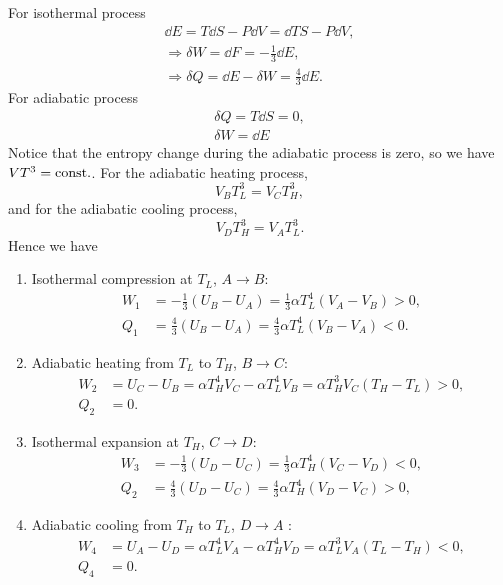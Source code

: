 \documentclass[10pt]{article}
\begin{document}
For isothermal process 
\begin{gather*}
	\dd{E} = T \dd{S} - P \dd{V} = \dd{TS} - P \dd{V}, \\
	\Longrightarrow \delta W = \dd{F} = -\frac{1}{3} \dd{E}, \\
	\Longrightarrow \delta Q = \dd{E} - \delta W = \frac{4}{3} \dd{E}.
\end{gather*}
For adiabatic process 
\begin{gather*}
	\delta Q = T \dd{S} = 0, \\
	\delta W = \dd{E}
\end{gather*}
Notice that the entropy change during the adiabatic process is zero, so we have $VT^3 = {\mathrm{const.}}$. For the adiabatic heating process, 
\begin{equation}
	V_B T_L^3 = V_C T_H^3,
\end{equation}
and for the adiabatic cooling process, 
\begin{equation}
	V_D T_H^3 = V_A T_L^3.
\end{equation}
Hence we have 
\begin{enumerate}[(1)]
	\item Isothermal compression at $T_L$, $A \to B$:
		\begin{align}
			W_1 &= -\frac{1}{3} (U_B - U_A) = \frac{1}{3} \alpha T_L^4(V_A - V_B)>0 , \\
			Q_1 &= \frac{4}{3} (U_B - U_A) = \frac{4}{3} \alpha T_L^4(V_B - V_A) < 0 .
		\end{align}
	\item Adiabatic heating from $T_L$ to $T_H$, $B \to C$:
		\begin{align}
			W_2 &= U_C - U_B = \alpha T_H^4 V_C - \alpha T_L^4 V_B = \alpha T_H^3 V_C (T_H - T_L) > 0, \\
			Q_2 &= 0.
		\end{align}
	\item Isothermal expansion at $T_H$, $C \to D$:
		\begin{align}
			W_3 &= -\frac{1}{3} (U_D - U_C) = \frac{1}{3} \alpha T_H^4(V_C - V_D) < 0, \\
			Q_2 &= \frac{4}{3} (U_D - U_C) = \frac{4}{3} \alpha T_H^4(V_D - V_C)>0 ,
		\end{align}
	\item Adiabatic cooling from $T_H$ to $T_L$, $D \to A$ :
		\begin{align}
			W_4 &= U_A - U_D = \alpha T_L^4 V_A - \alpha T_H^4 V_D = \alpha T_L^3 V_A (T_L - T_H) <0, \\
			Q_4 &= 0.
		\end{align}
\end{enumerate}
\end{document}
